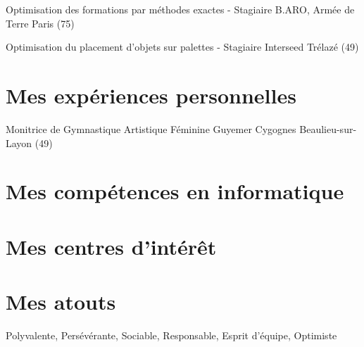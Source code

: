 \documentclass[french]{cvandletter}
\begin{document}
		{Optimisation des formations par méthodes exactes - Stagiaire}
		{B.ARO, Armée de Terre}
		{Paris (75)}
		{}
		{}

		{Optimisation du placement d'objets sur palettes - Stagiaire}
		{Interseed}
		{Trélazé (49)}
		{}
		{}

		
	\section{Mes expériences personnelles}
		{Monitrice de Gymnastique Artistique Féminine}
		{Guyemer Cygognes}
		{Beaulieu-sur-Layon (49)}
		{}
		{}
		


	\section{Mes compétences en informatique}


	\section{Mes centres d'intérêt}
	
	\section{Mes atouts}
		Polyvalente, Persévérante, Sociable, Responsable, Esprit d'équipe, Optimiste
\end{document}
